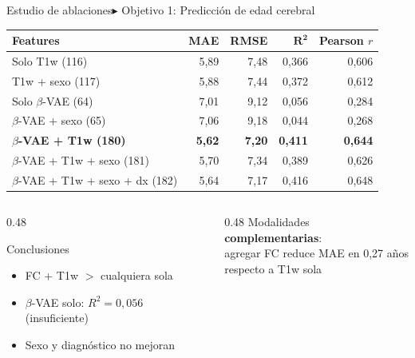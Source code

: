 \documentclass[aspectratio=169, 11pt]{beamer}
\newcommand{\highlight}[1]{\textcolor{uncaccent}{\textbf{#1}}}
\begin{document}
\begin{frame}{Estudio de ablaciones}{\color{uncyellow}\scriptsize $\blacktriangleright$ Objetivo 1: Predicción de edad cerebral}
  \centering
  {\footnotesize
  \begin{tabular}{lrrrr}
    \toprule
    \textbf{Features} & \textbf{MAE} & \textbf{RMSE} & $\boldsymbol{R^2}$ & \textbf{Pearson} $r$ \\
    \midrule
    Solo T1w (116) & 5,89 & 7,48 & 0,366 & 0,606 \\
    T1w + sexo (117) & 5,88 & 7,44 & 0,372 & 0,612 \\
    Solo $\beta$-VAE (64) & 7,01 & 9,12 & 0,056 & 0,284 \\
    $\beta$-VAE + sexo (65) & 7,06 & 9,18 & 0,044 & 0,268 \\
    \rowcolor{unclight}
    \textbf{$\beta$-VAE + T1w (180)} & \textbf{5,62} & \textbf{7,20} & \textbf{0,411} & \textbf{0,644} \\
    $\beta$-VAE + T1w + sexo (181) & 5,70 & 7,34 & 0,389 & 0,626 \\
    $\beta$-VAE + T1w + sexo + dx (182) & 5,64 & 7,17 & 0,416 & 0,648 \\
    \bottomrule
  \end{tabular}}

  \vspace{0.15cm}
  \begin{columns}[c]
    \begin{column}{0.48\textwidth}
      \begin{block}{Conclusiones}
        \begin{itemize}
          \item FC + T1w \highlight{$>$} cualquiera sola
          \item $\beta$-VAE solo: $R^2 = 0{,}056$ (insuficiente)
          \item Sexo y diagnóstico no mejoran
        \end{itemize}
      \end{block}
    \end{column}
    \begin{column}{0.48\textwidth}
      \centering
      \vspace{0.3cm}
      {\small Modalidades \highlight{complementarias}:\\
      agregar FC reduce MAE en 0,27 años\\respecto a T1w sola}
    \end{column}
  \end{columns}
\end{frame}
\end{document}
